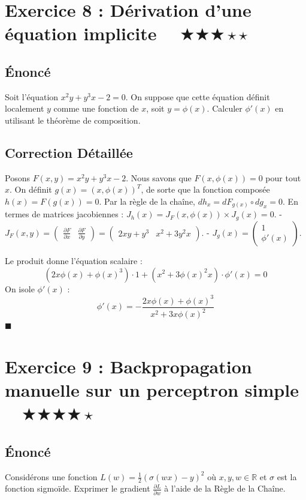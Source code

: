 \documentclass[11pt,a4paper]{article}
\begin{document}
\newpage
\section*{Exercice 8 : Dérivation d'une équation implicite $\quad \bigstar\bigstar\bigstar\star\star$}
\subsection*{Énoncé}
Soit l'équation $x^2 y + y^3 x - 2 = 0$. On suppose que cette équation définit localement $y$ comme une fonction de $x$, soit $y = \phi(x)$.
Calculer $\phi'(x)$ en utilisant le théorème de composition.
\subsection*{Correction Détaillée}
Posons $F(x, y) = x^2 y + y^3 x - 2$. Nous savons que $F(x, \phi(x)) = 0$ pour tout $x$.
On définit $g(x) = (x, \phi(x))^T$, de sorte que la fonction composée $h(x) = F(g(x)) = 0$.
Par la règle de la chaîne, $dh_x = dF_{g(x)} \circ dg_x = 0$.
En termes de matrices jacobiennes :
$J_h(x) = J_F(x, \phi(x)) \times J_g(x) = 0$.
- $J_F(x, y) = \begin{pmatrix} \frac{\partial F}{\partial x} & \frac{\partial F}{\partial y} \end{pmatrix} = \begin{pmatrix} 2xy + y^3 & x^2 + 3y^2 x \end{pmatrix}$.
- $J_g(x) = \begin{pmatrix} 1 \\ \phi'(x) \end{pmatrix}$.

Le produit donne l'équation scalaire :
$$ (2x\phi(x) + \phi(x)^3) \cdot 1 + (x^2 + 3\phi(x)^2 x) \cdot \phi'(x) = 0 $$
On isole $\phi'(x)$ :
$$ \phi'(x) = - \frac{2x\phi(x) + \phi(x)^3}{x^2 + 3x\phi(x)^2} $$
$\blacksquare$

\newpage
\section*{Exercice 9 : Backpropagation manuelle sur un perceptron simple $\quad \bigstar\bigstar\bigstar\bigstar\star$}
\subsection*{Énoncé}
Considérons une fonction $L(w) = \frac{1}{2} ( \sigma(wx) - y )^2$ où $x, y, w \in \mathbb{R}$ et $\sigma$ est la fonction sigmoïde.
Exprimer le gradient $\frac{\partial L}{\partial w}$ à l'aide de la Règle de la Chaîne.
\end{document}
